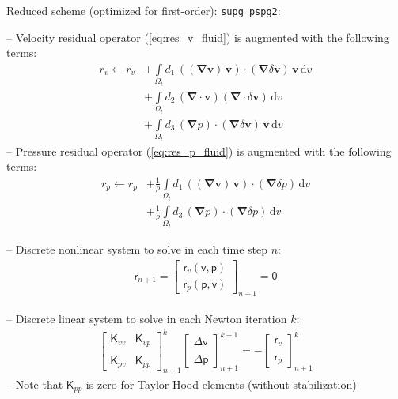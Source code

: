 \documentclass[a4paper,12pt]{report}
\newcommand{\bs}[1]{\boldsymbol{#1}}
\newcommand{\Om}{\mathit{\Omega}}
\newcommand{\ROP}{\bs{\mathsf{r}}}
\begin{document}
Reduced scheme (optimized for first-order): \verb.supg_pspg2.:

-- Velocity residual operator (\ref{eq:res_v_fluid}) is augmented with the following terms:
\begin{align}
r_v \leftarrow r_v &+ \int\limits_{\Om_t} d_1\,((\bs{\nabla}\bs{v})\,\bs{v}) \cdot (\bs{\nabla}\delta\bs{v})\,\bs{v}\,\mathrm{d}v \\
& + \int\limits_{\Om_t} d_2\,(\bs{\nabla}\cdot\bs{v}) (\bs{\nabla}\cdot\delta\bs{v})\,\mathrm{d}v\\
&+ \int\limits_{\Om_t} d_3\,(\bs{\nabla}p) \cdot (\bs{\nabla}\delta\bs{v})\,\bs{v}\,\mathrm{d}v 
\end{align}
-- Pressure residual operator (\ref{eq:res_p_fluid}) is augmented with the following terms:
\begin{align}
r_p \leftarrow r_p &+ \frac{1}{\rho}\int\limits_{\Om_t} d_1\,((\bs{\nabla}\bs{v})\,\bs{v}) \cdot (\bs{\nabla}\delta p)\,\mathrm{d}v \\
&+ \frac{1}{\rho}\int\limits_{\Om_t} d_3\,(\bs{\nabla}p) \cdot (\bs{\nabla}\delta p)\,\mathrm{d}v 
\end{align}

-- Discrete nonlinear system to solve in each time step $n$:
\begin{align}
\ROP_{n+1} = \begin{bmatrix} \ROP_{v}(\bs{\mathsf{v}},\bs{\mathsf{p}}) \\ \ROP_{p}(\bs{\mathsf{p}},\bs{\mathsf{v}}) \end{bmatrix}_{n+1} = \bs{\mathsf{0}}\label{eq:nonlin_sys_fluid}
\end{align}

-- Discrete linear system to solve in each Newton iteration $k$:
\begin{align}
\begin{bmatrix} \bs{\mathsf{K}}_{vv} & \bs{\mathsf{K}}_{vp} \\ \\ \bs{\mathsf{K}}_{pv} & \bs{\mathsf{K}}_{pp} \end{bmatrix}_{n+1}^{k}\begin{bmatrix} \Delta\bs{\mathsf{v}} \\ \\ \Delta\bs{\mathsf{p}} \end{bmatrix}_{n+1}^{k+1}=-\begin{bmatrix} \ROP_{v} \\ \\ \ROP_{p} \end{bmatrix}_{n+1}^{k} \label{eq:lin_sys_fluid}
\end{align}
-- Note that $\bs{\mathsf{K}}_{pp}$ is zero for Taylor-Hood elements (without stabilization)
\end{document}
